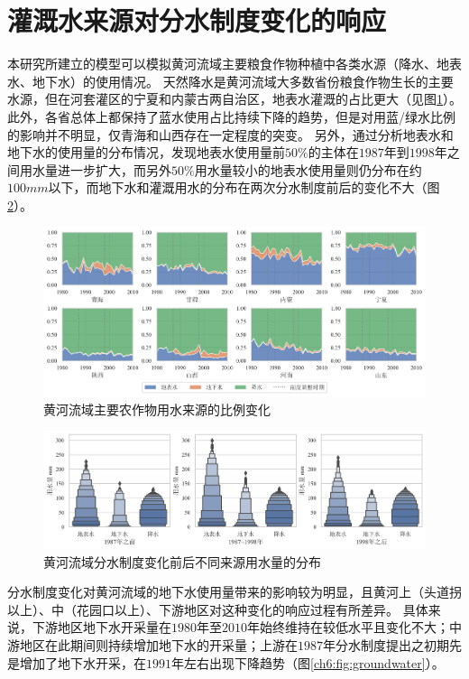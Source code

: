 \section{灌溉水来源对分水制度变化的响应}

本研究所建立的模型可以模拟黄河流域主要粮食作物种植中各类水源（降水、地表水、地下水）的使用情况。
天然降水是黄河流域大多数省份粮食作物生长的主要水源，但在河套灌区的宁夏和内蒙古两自治区，地表水灌溉的占比更大（见图\ref{ch6:fig:sources}）。
此外，各省总体上都保持了蓝水使用占比持续下降的趋势，但是对用蓝/绿水比例的影响并不明显，仅青海和山西存在一定程度的突变。
另外，通过分析地表水和地下水的使用量的分布情况，发现地表水使用量前$50\%$的主体在$1987$年到$1998$年之间用水量进一步扩大，而另外$50\%$用水量较小的地表水使用量则仍分布在约$100mm$以下，而地下水和灌溉用水的分布在两次分水制度前后的变化不大（图\ref{ch6:fig:sources_change}）。


\begin{figure}[htb]
    \centering
    \includegraphics[width=\textwidth]{img/ch6/ch6_green_blue_water.png}
    \caption{黄河流域主要农作物用水来源的比例变化}\label{ch6:fig:sources}
\end{figure}

\begin{figure}[htb]
    \centering
    \includegraphics[width=\textwidth]{img/ch6/ch6_sources_change.png}
    \caption{黄河流域分水制度变化前后不同来源用水量的分布}\label{ch6:fig:sources_change}
\end{figure}

分水制度变化对黄河流域的地下水使用量带来的影响较为明显，且黄河上（头道拐以上）、中（花园口以上）、下游地区对这种变化的响应过程有所差异。
具体来说，下游地区地下水开采量在$1980$年至$2010$年始终维持在较低水平且变化不大；中游地区在此期间则持续增加地下水的开采量；上游在$1987$年分水制度提出之初期先是增加了地下水开采，在$1991$年左右出现下降趋势（图\ref{ch6:fig:groundwater}）。


